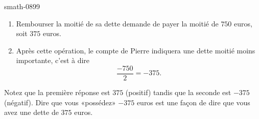 
\begin{corrige}{smath-0899}

    \begin{enumerate}
        \item
            Rembourser la moitié de sa dette demande de payer la moitié de \( 750\) euros, soit \( 375\) euros.
        \item
            Après cette opération, le compte de Pierre indiquera une dette moitié moins importante, c'est à dire
            \begin{equation}
                \frac{ -750 }{ 2 }=-375.
            \end{equation}
    \end{enumerate}
    Notez que la première réponse est \( 375\) (positif) tandis que la seconde est \( -375\) (négatif). Dire que vous «possédez» \( -375\) euros est une façon de dire que vous avez une dette de \( 375\) euros.

\end{corrige}
